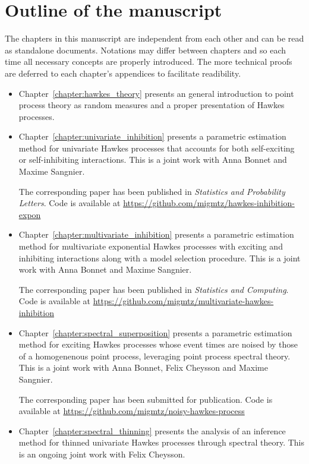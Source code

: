     \section{Outline of the manuscript} The chapters in this manuscript are independent from each other and can 
    be read as standalone documents.
    Notations may differ between chapters and so each time all necessary concepts are properly introduced.
    The more technical proofs are deferred to each chapter's appendices to facilitate readibility.
    \begin{itemize}
        \item Chapter~\ref{chapter:hawkes_theory} presents an general introduction to point process theory as random measures and a proper presentation of Hawkes processes.
        
        \item Chapter~\ref{chapter:univariate_inhibition} presents a parametric estimation method for univariate Hawkes processes that accounts for both self-exciting or self-inhibiting interactions. 
        This is a joint work with Anna Bonnet and Maxime Sangnier. 

        The corresponding paper \parencite{bonnet2021} has been published in \textit{Statistics and Probability Letters}.
        Code is available at \url{https://github.com/migmtz/hawkes-inhibition-expon}

        \item Chapter~\ref{chapter:multivariate_inhibition} presents a parametric estimation method for multivariate exponential Hawkes processes with exciting and inhibiting interactions along with a model selection procedure. 
        This is a joint work with Anna Bonnet and Maxime Sangnier. 

        The corresponding paper \parencite{Bonnet2023} has been published in \textit{Statistics and Computing}.
        Code is available at \url{https://github.com/migmtz/multivariate-hawkes-inhibition}

        \item Chapter~\ref{chapter:spectral_superposition} presents a parametric estimation method for exciting Hawkes processes whose event times are noised by those of a homogenenous point process, leveraging point process spectral theory. 
        This is a joint work with Anna Bonnet, Felix Cheysson and Maxime Sangnier. 

        The corresponding paper \parencite{Bonnet2024} has been submitted for publication.
        Code is available at \url{https://github.com/migmtz/noisy-hawkes-process}

        \item Chapter~\ref{chapter:spectral_thinning} presents the analysis of an inference method for thinned univariate Hawkes processes through spectral theory. 
        This is an ongoing joint work with Felix Cheysson.
    \end{itemize}


